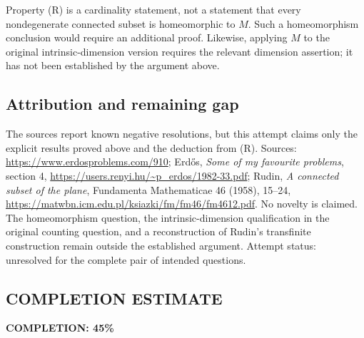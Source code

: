 Property (R) is a cardinality statement, not a statement that every nondegenerate connected subset is homeomorphic to \(M\).
Such a homeomorphism conclusion would require an additional proof.
Likewise, applying \(M\) to the original intrinsic-dimension version requires the relevant dimension assertion; it has not been established by the argument above.

\subsection*{Attribution and remaining gap}
The sources report known negative resolutions, but this attempt claims only the explicit results proved above and the deduction from (R).
Sources: \url{https://www.erdosproblems.com/910};
Erd\H{o}s, \emph{Some of my favourite problems}, section 4,
\url{https://users.renyi.hu/~p_erdos/1982-33.pdf};
Rudin, \emph{A connected subset of the plane}, Fundamenta Mathematicae 46 (1958), 15--24,
\url{https://matwbn.icm.edu.pl/ksiazki/fm/fm46/fm4612.pdf}.
No novelty is claimed.
The homeomorphism question, the intrinsic-dimension qualification in the original counting question, and a reconstruction of Rudin's transfinite construction remain outside the established argument. Attempt status: unresolved for the complete pair of intended questions.
\subsection*{COMPLETION ESTIMATE}
\textbf{COMPLETION: 45\%}
